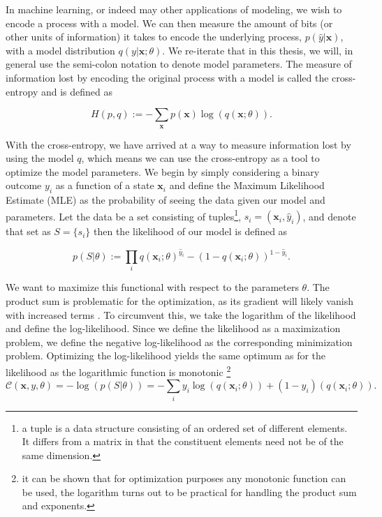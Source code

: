 In machine learning, or indeed may other applications of modeling, we wish to encode a process with a model. We can then measure the amount of bits (or other units of information) it takes to encode the underlying process, $p(\hat{y} | \mathbf{x})$, with a model distribution $q(y| \mathbf{x}; \theta)$. We re-iterate that in this thesis, we will, in general use the semi-colon notation to denote model parameters. The measure of information lost by encoding the original process with a model is called the cross-entropy and is defined as

\begin{equation}
H(p, q) := - \sum_\mathbf{x} p(\mathbf{x})\log(q(\mathbf{x}; \theta)).
\end{equation}

\noindent With the cross-entropy, we have arrived at a way to measure information lost by using the model $q$, which means we can use the cross-entropy as a tool to optimize the model parameters. We begin by simply considering a binary outcome $y_i$ as a function of a state $\mathbf{x}_i$ and define the Maximum Likelihood Estimate (MLE) as the probability of seeing the data given our model and parameters. Let the data be a set consisting of tuples\footnote{a tuple is a data structure consisting of an ordered set of different elements. It differs from a matrix in that the constituent elements need not be of the same dimension.}, $s_i = (\mathbf{x}_i, \hat{y}_i)$, and denote that set as $S = \{s_i\}$ then the likelihood of our model is defined as 

\begin{equation}\label{eq:likelihood}
p(S | \theta) := \prod_i q(\mathbf{x}_i; \theta)^{\hat{y}_i} - (1-q(\mathbf{x}_i; \theta))^{1-\hat{y}_i}.
\end{equation}

\noindent We want to maximize this functional with respect to the parameters $\theta$. The product sum is problematic for the optimization, as its gradient will likely vanish with increased terms . To circumvent this, we take the logarithm of the likelihood and define the log-likelihood. Since we define the likelihood as a maximization problem, we define the negative log-likelihood as the corresponding minimization problem. Optimizing the log-likelihood yields the same optimum as for the likelihood as the logarithmic function is monotonic \footnote{it can be shown that for optimization purposes any monotonic function can be used, the logarithm turns out to be practical for handling the product sum and exponents.}
\begin{equation}\label{eq:mle}
\mathcal{C}(\mathbf{x}, y, \theta) = -\log(p(S | \theta)) = -\sum_i y_i\log(q(\mathbf{x}_i; \theta)) + (1-y_i)(q(\mathbf{x}_i; \theta)).
\end{equation}

